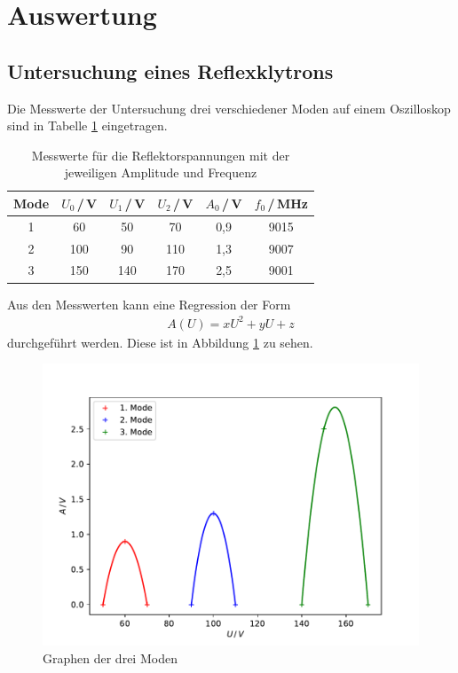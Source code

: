 \section{Auswertung}
\subsection{Untersuchung eines Reflexklytrons}
Die Messwerte der Untersuchung drei verschiedener Moden auf einem Oszilloskop sind
in Tabelle \ref{tab:reflex} eingetragen.
\begin{table}
  \centering
  \begin{tabular}{c c c c c c}
    \toprule
    {Mode} & {$U_0$\,/\,V} & {$U_1$\,/\,V} & {$U_2$\,/\,V} & {$A_0$\,/\,V} & {$f_0$\,/\,MHz} \\
    \midrule
    1 & 60 & 50 & 70 & 0,9 & 9015 \\
    2 & 100 & 90 & 110 & 1,3 & 9007 \\
    3 & 150 & 140 & 170 & 2,5 & 9001 \\
    \bottomrule
  \end{tabular}
  \caption{Messwerte für die Reflektorspannungen mit der jeweiligen Amplitude und Frequenz}
  \label{tab:reflex}
\end{table}
\newline
Aus den Messwerten kann eine Regression der Form
\begin{align*}
    A(U) = xU^2 + yU+ z
\end{align*}
durchgeführt werden. Diese ist in Abbildung \ref{fig:regression} zu sehen.
\begin{figure}
  \centering
  \includegraphics[width = 12 cm]{moden.pdf}
  \caption{Graphen der drei Moden}
  \label{fig:regression}
\end{figure}
